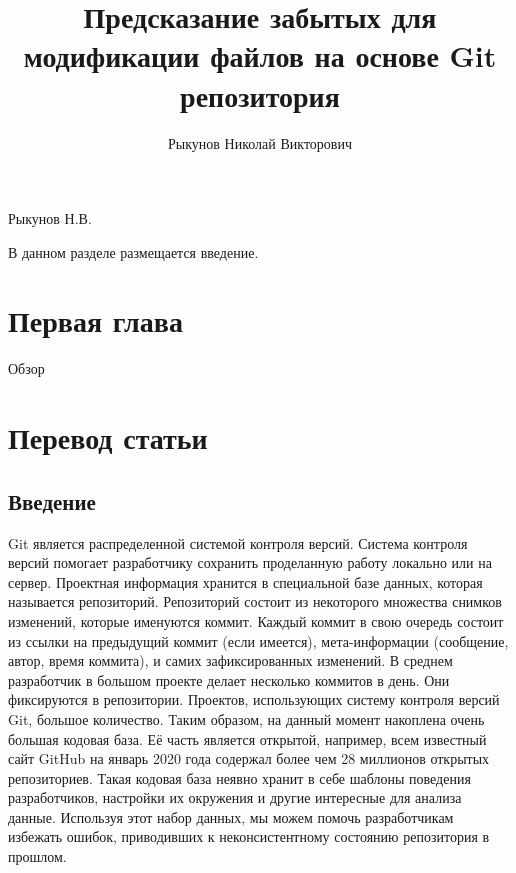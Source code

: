 \documentclass[times]{itmo-student-thesis}
\begin{document}
\title{Предсказание забытых для модификации файлов на основе Git репозитория}
\author{Рыкунов Николай Викторович}{Рыкунов Н.В.}




\tableofcontents

\startprefacepage

В данном разделе размещается введение.

\chapter{Первая глава}

\startrelatedwork
Обзор
\finishrelatedwork


\chapter{Перевод статьи}
\section{Введение}
Git является распределенной системой контроля версий. Система контроля версий помогает разработчику сохранить проделанную работу локально или на сервер. Проектная информация хранится в специальной базе данных, которая называется репозиторий. Репозиторий состоит из некоторого множества снимков изменений, которые именуются коммит. Каждый коммит в свою очередь состоит из ссылки на предыдущий коммит (если имеется), мета-информации (сообщение, автор, время коммита), и самих зафиксированных изменений. В среднем разработчик в большом проекте делает несколько коммитов в день. Они фиксируются в репозитории. Проектов, использующих систему контроля версий Git, большое количество. Таким образом, на данный момент накоплена очень большая кодовая база. Её часть является открытой, например, всем известный сайт GitHub на январь 2020 года содержал более чем 28 миллионов открытых репозиториев. Такая кодовая база неявно хранит в себе шаблоны поведения разработчиков, настройки их окружения и другие интересные для анализа данные. Используя этот набор данных, мы можем помочь разработчикам избежать ошибок, приводивших к неконсистентному состоянию репозитория в прошлом.
\end{document}
